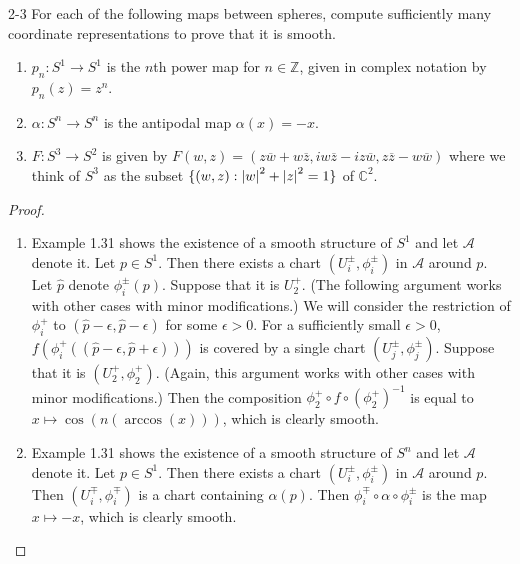 \begin{customprob}{2-3}\label{problem_2_3}
  For each of the following maps between spheres, compute sufficiently many coordinate representations to prove that it is smooth.

  \begin{enumerate}[label=(\alph*)]
    \item 
      $p_n: S^1 \rightarrow S^1$ is the $n$th power map for $n \in \mathbb{Z}$, given in complex notation by $p_n(z) = z^n$.
    \item
      $\alpha: S^n \rightarrow S^n$ is the antipodal map $\alpha(x) = -x$.
    \item
      $F: S^3 \rightarrow S^2$ is given by $F(w, z) = (z\overline{w} + w\overline{z}, iw\overline{z} - iz\overline{w}, z\overline{z} - w\overline{w})$ where we think of $S^3$ as the subset $\{ (w, z) : \abs{w}^2 + \abs{z}^2 = 1 \}$ of $\mathbb{C}^2$.
  \end{enumerate}
\end{customprob}

\begin{proof}
  $ $
  \begin{enumerate}[label=(\alph*)]
    \item 
      Example 1.31 shows the existence of a smooth structure of $S^1$ and let $\mathcal{A}$ denote it.
      Let $p \in S^1$.
      Then there exists a chart $(U_i^{\pm}, \phi_i^{\pm})$ in $\mathcal{A}$ around $p$.
      Let $\hat{p}$ denote $\phi_i^{\pm}(p)$.
      Suppose that it is $U_2^{+}$.
      (The following argument works with other cases with minor modifications.)
      We will consider the restriction of $\phi_i^{+}$ to $(\hat{p} - \epsilon, \hat{p} - \epsilon)$ for some $\epsilon > 0$.
      For a sufficiently small $\epsilon > 0$, $f(\phi_i^{+}((\hat{p} - \epsilon, \hat{p} + \epsilon)))$ is covered by a single chart $(U_j^{\pm}, \phi_j^{\pm})$.
      Suppose that it is $(U_2^{+}, \phi_2^{+})$.
      (Again, this argument works with other cases with minor modifications.)
      Then the composition $\phi_2^{+} \circ f \circ (\phi_2^{+})^{-1}$ is equal to $x \mapsto \cos(n(\arccos(x)))$, which is clearly smooth.
    \item
      Example 1.31 shows the existence of a smooth structure of $S^n$ and let $\mathcal{A}$ denote it.
      Let $p \in S^1$.
      Then there exists a chart $(U_i^{\pm}, \phi_i^{\pm})$ in $\mathcal{A}$ around $p$.
      Then $(U_i^{\mp}, \phi_i^{\mp})$ is a chart containing $\alpha(p)$.
      Then $\phi_i^{\mp} \circ \alpha \circ \phi_i^{\pm}$ is the map $x \mapsto -x$, which is clearly smooth.
  \end{enumerate}
\end{proof}
